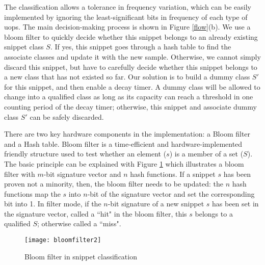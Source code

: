 The classification allows a tolerance in frequency variation, which can be easily implemented by ignoring the least-significant bits in frequency of each type of uops.  The main decision-making process is shown in Figure \ref{flow}(b). We use a bloom filter to quickly decide whether this snippet belongs to an already existing snippet class $S$. If yes, this snippet goes through a hash table to find the associate classes and update it with the new sample. Otherwise, we cannot simply discard this snippet, but have to carefully decide whether this snippet belongs to a new class that has not existed so far. Our solution is to build a dummy class $S'$ for this snippet, and then enable a decay timer. A dummy class will be allowed to change into a qualified class as long as its capacity can reach a threshold in one counting period of the decay timer; otherwise, this snippet and associate dummy class $S'$ can be safely discarded.

There are two key hardware components in the implementation: a Bloom filter and a Hash table. Bloom filter is a time-efficient and hardware-implemented friendly  structure used to test whether an element ($s$) is a member of a set ($S$).  The basic principle can be explained with Figure \ref{bfilter} which illustrates a bloom filter with $m$-bit signature vector and $n$ hash functions. If a snippet $s$ has been proven not a minority, then, the bloom filter needs to be updated: the $n$ hash functions map the $s$ into $n$-bit of the signature vector and set the corresponding bit into 1. In filter mode, if the $n$-bit signature of a new snippet $s$ has been set in the signature vector, called a ``hit" in the bloom filter, this $s$ belongs to a qualified $S$; otherwise called a ``miss".

\begin{figure}[t]
  \centering
  \texttt{[image: bloomfilter2]}\\

  \caption{Bloom filter in snippet classification}\label{bfilter}

\end{figure}

